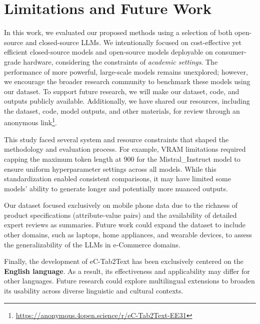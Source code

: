 \section{Limitations and Future Work}
In this work, we evaluated our proposed methods using a selection of both open-source and closed-source LLMs. We intentionally focused on cost-effective yet efficient closed-source models and open-source models deployable on consumer-grade hardware, considering the constraints of \emph{academic settings}. The performance of more powerful, large-scale models remains unexplored; however, we encourage the broader research community to benchmark these models using our dataset. To support future research, we will make our dataset, code, and outputs publicly available. Additionally, we have shared our resources, including the dataset, code, model outputs, and other materials, for review through an anonymous link\footnote{\url{https://anonymous.4open.science/r/eC-Tab2Text-EE31}}.

This study faced several system and resource constraints that shaped the methodology and evaluation process. For example, VRAM limitations required capping the maximum token length at 900 for the Mistral\_Instruct model to ensure uniform hyperparameter settings across all models. While this standardization enabled consistent comparisons, it may have limited some models' ability to generate longer and potentially more nuanced outputs.

Our dataset focused exclusively on mobile phone data due to the richness of product specifications (attribute-value pairs) and the availability of detailed expert reviews as summaries. Future work could expand the dataset to include other domains, such as laptops, home appliances, and wearable devices, to assess the generalizability of the LLMs in e-Commerce domains. 

Finally, the development of eC-Tab2Text has been exclusively centered on the \textbf{English language}. As a result, its effectiveness and applicability may differ for other languages. Future research could explore multilingual extensions to broaden its usability across diverse linguistic and cultural contexts.